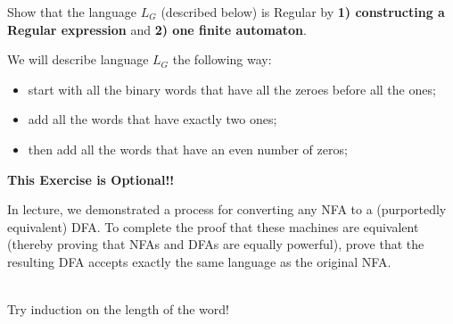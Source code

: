 \documentclass[12pt]{article}
\newenvironment{exercise}[2][Exercise]{\begin{trivlist}
\item[\hskip \labelsep {\bfseries #1}\hskip \labelsep {\bfseries #2.}]}{\end{trivlist}}
\newenvironment{solution}[1][{\color{red} Solution:}]{\begin{trivlist}
\item[\hskip \labelsep {\bfseries #1}\hskip \labelsep {\bfseries}]}{\end{trivlist}}
\begin{document}
\begin{solution}

\end{solution}

\newpage


\begin{exercise}{4}

Show that the language $L_G$ (described below) is Regular by \textbf{1) constructing a Regular expression} and \textbf{ 2) one finite automaton}.


We will describe language $L_G$ the following way: 

\begin{itemize}
    \item start with all the binary words that have all the zeroes before all the ones;
    \item add all the words that have exactly two ones;
    \item then add all the words that have an even number of zeros;
\end{itemize}

\end{exercise}

\begin{solution} \quad

\end{solution}

\newpage


\begin{exercise}{5}

\textbf{This Exercise is Optional!!}

In lecture, we demonstrated a process for converting any NFA to a (purportedly equivalent) DFA. To complete the proof that these machines are equivalent (thereby proving that NFAs and DFAs are equally powerful), prove that the resulting DFA accepts exactly the same language as the original NFA.\\\\
\begin{tip}
Try induction on the length of the word!
\end{tip}
\end{exercise}
\end{document}
